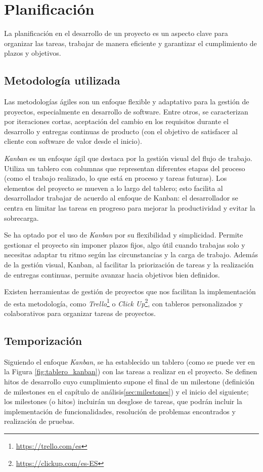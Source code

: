 \chapter{Planificación}

La planificación en el desarrollo de un proyecto es un aspecto clave para organizar las tareas, trabajar de manera eficiente y garantizar el cumplimiento de plazos y objetivos.

\section{Metodología utilizada}
Las metodologías ágiles son un enfoque flexible y adaptativo para la gestión de proyectos, especialmente en desarrollo de software. Entre otros, se caracterizan por iteraciones cortas, aceptación del cambio en los requisitos durante el desarrollo y entregas continuas de producto (con el objetivo de satisfacer al cliente con software de valor desde el inicio)\cite{agileprinciples}.

\textit{Kanban} es un enfoque ágil que destaca por la gestión visual del flujo de trabajo. Utiliza un tablero con columnas que representan diferentes etapas del proceso (como el trabajo realizado, lo que está en proceso y tareas futuras). Los elementos del proyecto se mueven a lo largo del tablero; esto facilita al desarrollador trabajar de acuerdo al enfoque de Kanban: el desarrollador se centra en limitar las tareas en progreso para mejorar la productividad y evitar la sobrecarga\cite{majkamastering}.

Se ha optado por el uso de \textit{Kanban} por su flexibilidad y simplicidad. Permite gestionar el proyecto sin imponer plazos fijos, algo útil cuando trabajas solo y necesitas adaptar tu ritmo según las circunstancias y la carga de trabajo. Además de la gestión visual, Kanban, al facilitar la priorización de tareas y la realización de entregas continuas, permite avanzar hacia objetivos bien definidos.

Existen herramientas de gestión de proyectos que nos facilitan la implementación de esta metodología, como \textit{Trello}\footnote{\url{https://trello.com/es}} o \textit{Click Up}\footnote{\url{https://clickup.com/es-ES}}, con tableros personalizados y colaborativos para organizar tareas de proyectos.


\section{Temporización}
Siguiendo el enfoque \textit{Kanban}, se ha establecido un tablero (como se puede ver en la Figura \ref{fig:tablero_kanban}) con las tareas a realizar en el proyecto. Se definen hitos de desarrollo cuyo cumplimiento supone el final de un milestone (definición de milestones en el capítulo de análisis\ref{sec:milestones}) y el inicio del siguiente; los milestones (o hitos) incluirán un desglose de tareas, que podrán incluir la implementación de funcionalidades, resolución de problemas encontrados y realización de pruebas. 

